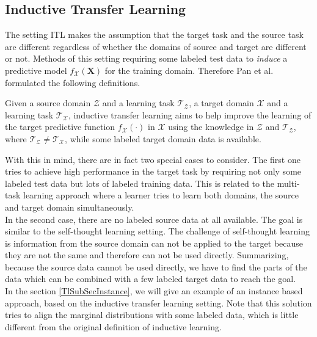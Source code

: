 \subsection{Inductive Transfer Learning}\label{TlSubSecInduc}
The setting \ac{ITL} makes the assumption that the target task and the source task are different regardless of whether the domains of source and target are different or not.
Methods of this setting requiring some labeled test data to \textit{induce} a predictive model $f_\mathcal{X}(\mathbf{X})$ for the training domain.\cite{Pan.2010}
Therefore Pan et al. formulated the following definitions.
\begin{mDef}\label{DefITL}
	 Given a source domain $\mathcal{Z}$ and a learning task $\mathcal{T_Z}$, a target domain $\mathcal{X}$ and a learning task $\mathcal{T_X}$, inductive transfer learning aims to help improve the learning of the target predictive function $f_\mathcal{X}(\cdot)$ in $\mathcal{X}$ using the knowledge in $\mathcal{Z}$ and $\mathcal{T_Z}$, where $\mathcal{T_Z} \neq \mathcal{T_X}$, while some labeled target domain data is available.
\end{mDef} 
With this in mind, there are in fact two special cases to consider.
The first one tries to achieve high performance in the target task by requiring not only some labeled test data but lots of labeled training data.
This is related to the multi-task learning approach where a learner tries to learn both domains, the source and target domain simultaneously.\cite{Pan.2010}\\
In the second case, there are no labeled source data at all available.
The goal is similar to the self-thought learning setting.
The challenge of self-thought learning is information from the source domain can not be applied to the target because they are not the same and therefore can not be used directly.
Summarizing, because the source data cannot be used directly, we have to find the parts of the data which can be combined with a few labeled target data to reach the goal.\cite{Pan.2010}\\
In the section \ref{TlSubSecInstance}, we will give an example of an instance based approach, based on the inductive transfer learning setting.
Note that this solution tries to align the marginal distributions with some labeled data, which is little different from the original definition of inductive learning.


